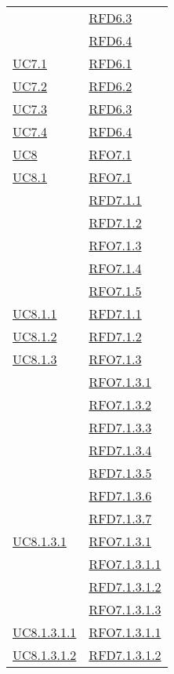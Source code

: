 \begin{longtable}{|>{\centering}m{5cm}|m{5cm}<{\centering}|}
& \hyperlink{RFD6.3}{RFD6.3}\\
& \hyperlink{RFD6.4}{RFD6.4}\\ \hline
\hyperref[UC7.1]{UC7.1} & \hyperlink{RFD6.1}{RFD6.1}\\ \hline
\hyperref[UC7.2]{UC7.2} & \hyperlink{RFD6.2}{RFD6.2}\\ \hline
\hyperref[UC7.3]{UC7.3} & \hyperlink{RFD6.3}{RFD6.3}\\ \hline
\hyperref[UC7.4]{UC7.4} & \hyperlink{RFD6.4}{RFD6.4}\\ \hline
\hyperref[UC8]{UC8} & \hyperlink{RFO7.1}{RFO7.1}\\ \hline
\hyperref[UC8.1]{UC8.1} & \hyperlink{RFO7.1}{RFO7.1}\\
& \hyperlink{RFD7.1.1}{RFD7.1.1}\\
& \hyperlink{RFD7.1.2}{RFD7.1.2}\\
& \hyperlink{RFO7.1.3}{RFO7.1.3}\\
& \hyperlink{RFO7.1.4}{RFO7.1.4}\\
& \hyperlink{RFO7.1.5}{RFO7.1.5}\\ \hline
\hyperref[UC8.1.1]{UC8.1.1} & \hyperlink{RFD7.1.1}{RFD7.1.1}\\ \hline
\hyperref[UC8.1.2]{UC8.1.2} & \hyperlink{RFD7.1.2}{RFD7.1.2}\\ \hline
\hyperref[UC8.1.3]{UC8.1.3} & \hyperlink{RFO7.1.3}{RFO7.1.3}\\
& \hyperlink{RFO7.1.3.1}{RFO7.1.3.1}\\
& \hyperlink{RFO7.1.3.2}{RFO7.1.3.2}\\
& \hyperlink{RFD7.1.3.3}{RFD7.1.3.3}\\
& \hyperlink{RFD7.1.3.4}{RFD7.1.3.4}\\
& \hyperlink{RFD7.1.3.5}{RFD7.1.3.5}\\
& \hyperlink{RFD7.1.3.6}{RFD7.1.3.6}\\
& \hyperlink{RFD7.1.3.7}{RFD7.1.3.7}\\ \hline
\hyperref[UC8.1.3.1]{UC8.1.3.1} & \hyperlink{RFO7.1.3.1}{RFO7.1.3.1}\\
& \hyperlink{RFO7.1.3.1.1}{RFO7.1.3.1.1}\\
& \hyperlink{RFD7.1.3.1.2}{RFD7.1.3.1.2}\\
& \hyperlink{RFO7.1.3.1.3}{RFO7.1.3.1.3}\\ \hline
\hyperref[UC8.1.3.1.1]{UC8.1.3.1.1} & \hyperlink{RFO7.1.3.1.1}{RFO7.1.3.1.1}\\ \hline
\hyperref[UC8.1.3.1.2]{UC8.1.3.1.2} & \hyperlink{RFD7.1.3.1.2}{RFD7.1.3.1.2}\\

\end{longtable}
